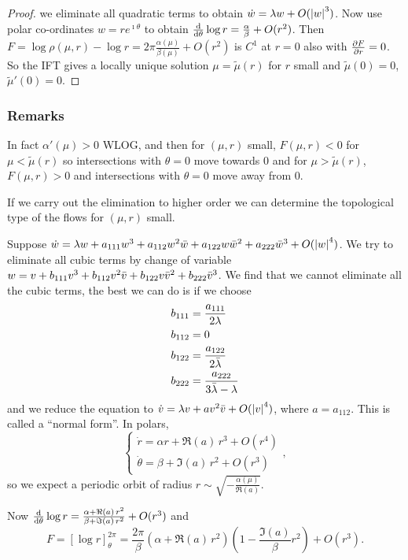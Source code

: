 \documentclass{notes}
\theoremstyle{plain}
\begin{document}
\begin{proof}
we eliminate all quadratic terms to obtain $\dot{w} = \lambda{w} +
O(\left|w\right|^3)$.  Now use polar co-ordinates $w = r e^{\imath \theta}$
to obtain $\frac{\mathrm{d}}{\mathrm{d}\theta} \log r = \frac{\alpha}{\beta} +
O(r^2)$.  Then $F = \log \rho(\mu,r) - \log r = 2 \pi
\frac{\alpha(\mu)}{\beta(\mu)} + O(r^2)$ is $C^1$ at $r=0$ also with
$\frac{\partial F}{\partial r} = 0$.  So the IFT gives a locally unique solution $\mu =
\tilde{\mu}(r)$ for $r$ small and $\tilde{\mu}(0) = 0$,
$\tilde{\mu}'(0) = 0$.
\end{proof}

\subsubsection*{Remarks}

In fact $\alpha'(\mu) > 0$ WLOG, and then for $(\mu,r)$ small, $F(\mu,r) < 0$
for $\mu < \tilde{\mu}(r)$ so intersections with $\theta=0$ move towards $0$
and for $\mu > \tilde{\mu}(r)$, $F(\mu,r) > 0$ and intersections with
$\theta=0$ move away from $0$.

If we carry out the elimination to higher order we can determine the
topological type of the flows for $(\mu,r)$ small.

Suppose $\dot{w} = \lambda w + a_{111} w^3 + a_{112}w^2\Bar{w}
+ a_{122}w \Bar{w}^2 + a_{222} \Bar{w}^3 + O(\left|w\right|^4)$.  We try to
eliminate all cubic terms by change of variable
$w = v + b_{111} v^3 + b_{112}v^2\Bar{v} + b_{122}v \Bar{v}^2 + b_{222}
\Bar{v}^3$.  We find that we cannot eliminate all the cubic terms, the
best we can do is if we choose
\begin{align*}
b_{111} &= \frac{a_{111}}{2 \lambda} \\
b_{112} & = 0 \\
b_{122} & = \frac{a_{122}}{2 \Bar{\lambda}} \\
b_{222}  &= \frac{a_{222}}{3 \Bar{\lambda} - \lambda}
\end{align*}
and we reduce the equation to $\dot{v} = \lambda{v}
+ a v^2 \Bar{v} + O(\left|v\right|^4)$, where $a=a_{112}$.  This is called
a ``normal form''.  In polars,
\[
\begin{cases}
\dot{r} = \alpha r + \Re(a)\, r^3 + O(r^4) \\
\dot{\theta} = \beta + \Im(a)\, r^2 + O(r^3)
\end{cases},
\]
so we expect a periodic orbit of radius $r \sim \sqrt{-\frac{\alpha(\mu)}
{\Re(a)}}$.

Now $\frac{\mathrm{d}}{\mathrm{d}\theta} \log r = \frac{\alpha + \Re(a)\, r^2}{\beta
+ \Im(a)\, r^2} + O(r^3)$ and 
\[
F = \left[ \log r \right]_\theta^{2 \pi}
= \frac{2 \pi}{\beta} \left(\alpha + \Re(a)\, r^2 \right)
\left(1- \frac{\Im(a)}{\beta} r^2 \right) + O(r^3).
\]
\end{document}
